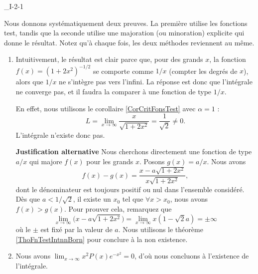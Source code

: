 

\begin{corrige}{_I-2-1}

Nous donnons systématiquement deux preuves. La première utilise les fonctions test, tandis que la seconde utilise une majoration (ou minoration) explicite qui donne le résultat. Notez qu'à chaque fois, les deux méthodes reviennent au même.

\begin{enumerate}

\item Intuitivement, le résultat est clair parce que, pour des grands $x$, la fonction $f(x)=(1+2x^2)^{-1/2}$ se comporte comme $1/x$ (compter les degrés de $x$), alors que $1/x$ ne s'intègre pas vers l'infini. La réponse est donc que l'intégrale ne converge pas, et il faudra la comparer à une fonction de type $1/x$. 

En effet, nous utilisons le corollaire \ref{CorCritFonsTest} avec $\alpha=1$ :
\begin{equation}
	L=\lim_{x\to\infty}\frac{ x }{ \sqrt{1+2x^2} }=\frac{1}{ \sqrt{2} }\neq 0.
\end{equation}
L'intégrale n'existe donc pas.

{\bf Justification alternative}
Nous cherchons directement une fonction de type $a/x$ qui majore $f(x)$ pour les grands $x$.
Posons $g(x)=a/x$. Nous avons
\begin{equation}
	f(x)-g(x)=\frac{ x-a\sqrt{1+2x^2} }{ x\sqrt{1+2x^2} },
\end{equation}
dont le dénominateur est toujours positif ou nul dans l'ensemble considéré. Dès que $a<1/\sqrt{2}$, il existe un $x_0$ tel que $\forall x>x_0$, nous avons $f(x)>g(x)$. Pour prouver cela, remarquez que
\begin{equation}
	\lim_{x\to\infty}\big( x-a\sqrt{1+2x^2} \big)=\lim_{x\to\infty}x(1-\sqrt{2}a)=\pm\infty
\end{equation}
où le $\pm$ est fixé par la valeur de $a$. Nous utilisons le théorème \ref{ThoFnTestIntnnBorn} pour conclure à la non existence.

\item 

Nous avons $\lim_{x\to\infty}x^2P(x) e^{-x^2}=0$, d'où nous concluons à l'existence de l'intégrale.


\end{enumerate}
\end{corrige}
